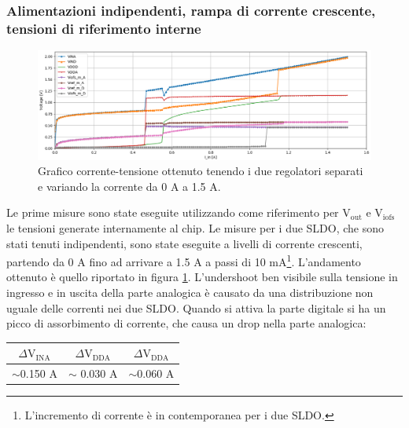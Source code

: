 \subsubsection{Alimentazioni indipendenti, rampa di corrente crescente, tensioni di riferimento interne}
\begin{figure}
\centering
\includegraphics[width=\textwidth]{Immagini/IUI2}
\caption{Grafico corrente-tensione ottenuto tenendo i due regolatori separati e variando la corrente da 0 A a 1.5 A.}%
\label{IUI}
\end{figure}
Le prime misure sono state eseguite utilizzando come riferimento per $\mathrm{V_{out}}$ e $\mathrm{V_{iofs}}$ le tensioni generate internamente al chip. Le misure per i due SLDO, che sono stati tenuti indipendenti, sono state eseguite a livelli di corrente crescenti, partendo da 0 A fino ad arrivare a 1.5 A a passi di 10 mA\footnote{L'incremento di corrente è in contemporanea per i due SLDO.}. 
L'andamento ottenuto è quello riportato in figura \ref{IUI}. L'undershoot ben visibile sulla tensione in ingresso e in uscita della parte analogica è causato da una distribuzione non uguale delle correnti nei due SLDO. 
Quando si attiva la parte digitale si ha un picco di assorbimento di corrente, che causa un drop nella parte analogica:
\begin{center}
\begin{tabular}{ccc }
\hline
$\Delta \mathrm{V_{INA}}$ & $\Delta \mathrm{V_{DDA}}$ &$\Delta \mathrm{V_{DDA}}$  \\ \hline
$\sim$0.150 A & $\sim$ 0.030 A& $\sim$0.060 A\\ \hline     
\end{tabular}
\end{center}

